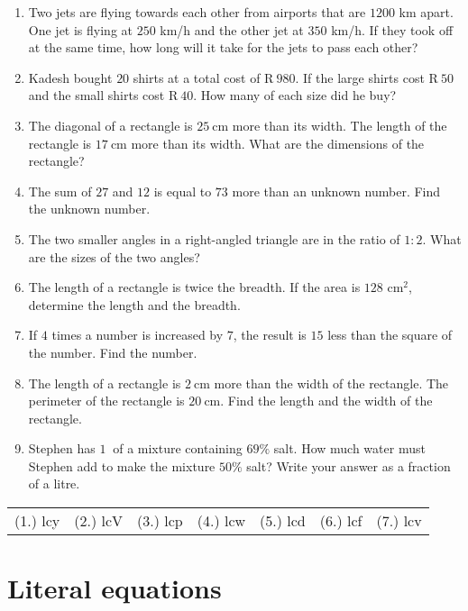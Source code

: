 \begin{exercises}{}
{
\begin{enumerate}[noitemsep, label=\textbf{\arabic*}. ] 
\item Two jets are flying towards each other from airports that are $1200$ km apart. One jet is flying at $250$ km/h and the other jet at $350$ km/h. If they took off at the same time, how long will it take for the jets to pass each other?
\item Kadesh bought $20$ shirts at a total cost of R$~980$. If the
  large shirts cost R$~50$ and the small shirts cost R$~40$. How many
  of each size did he buy?
\item The diagonal of a rectangle is $25~$cm more than its width. The length of the rectangle is $17~$cm more than its width. What are the dimensions of the rectangle?  
\item The sum of $27$ and $12$ is equal to $73$ more than an unknown number. Find the unknown number.
\item The two smaller angles in a right-angled triangle are in the ratio of $1:2$. What are the sizes of the two angles? 
\item The length of a rectangle is twice the breadth. If the area is $128$ cm$^{2}$, determine the length and the breadth.       
\item If $4$ times a number is increased by $7$, the result is $15$ less than the square of the number. Find the number.
\item The length of a rectangle is $2~$cm more than the width of the rectangle. The perimeter of the rectangle is $20~$cm. Find the length and the width of the rectangle.
\item Stephen has $1~$\ell{} of a mixture containing $69\%$ salt. How much water must Stephen add to make the mixture $50\%$ salt? Write your answer as a fraction of a litre.
       
\end{enumerate}
\practiceinfo
\par 
\par \begin{tabular}[h]{cccccc}
(1.) lcy  &  (2.) lcV  &  (3.) lcp  &  (4.) lcw  &  (5.) lcd  &  (6.) lcf  &  (7.) lcv  & \end{tabular}
}
\end{exercises}

\section{Literal equations}

